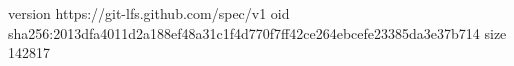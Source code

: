 version https://git-lfs.github.com/spec/v1
oid sha256:2013dfa4011d2a188ef48a31c1f4d770f7ff42ce264ebcefe23385da3e37b714
size 142817
